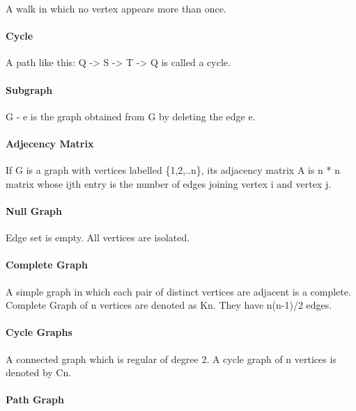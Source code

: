 A walk in which no vertex appears more than once.

\hypertarget{cycle}{%
\paragraph{Cycle}\label{cycle}}

A path like this: Q -\textgreater{} S -\textgreater{} T -\textgreater{}
Q is called a cycle.

\hypertarget{subgraph}{%
\paragraph{Subgraph}\label{subgraph}}

G - e is the graph obtained from G by deleting the edge e.

\hypertarget{adjecency-matrix}{%
\paragraph{Adjecency Matrix}\label{adjecency-matrix}}

If G is a graph with vertices labelled \{1,2,..n\}, its adjacency matrix
A is n * n matrix whose ijth entry is the number of edges joining vertex
i and vertex j.

\hypertarget{null-graph}{%
\paragraph{Null Graph}\label{null-graph}}

Edge set is empty. All vertices are isolated.

\hypertarget{complete-graph}{%
\paragraph{Complete Graph}\label{complete-graph}}

A simple graph in which each pair of distinct vertices are adjacent is a
complete. Complete Graph of n vertices are denoted as Kn. They have
n(n-1)/2 edges.

\hypertarget{cycle-graphs}{%
\paragraph{Cycle Graphs}\label{cycle-graphs}}

A connected graph which is regular of degree 2. A cycle graph of n
vertices is denoted by Cn.

\hypertarget{path-graph}{%
\paragraph{Path Graph}\label{path-graph}}

